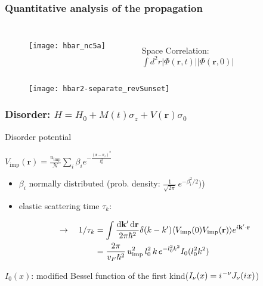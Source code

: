 \documentclass{beamer}
\newcommand{\vq}{\mathbf{r}}
\newcommand{\iu}{{i\mkern1mu}} 	%
\newcommand{\vk}{\mathbf{k}}
\begin{document}
  
\begin{frame}[t]%
  \frametitle{Quantitative analysis of the propagation}
  \vskip-0.7cm
  \begin{columns}
  
  \begin{figure}\centering
      \texttt{[image: hbar\_nc5a]}
  \end{figure}
  
  \hskip-1cm
  \\  Space Correlation:\\
  $\int d^2r |\Phi(\mathbf{r}, t)| |\Phi(\mathbf{r}, 0)|$\\
  
  
  \end{columns}
  \vskip-0.2cm
  
  \begin{figure}\centering
   \texttt{[image: hbar2-separate\_revSunset]}
  \end{figure}
  
  \end{frame}

\begin{frame}%
  \frametitle{Disorder: $H = H_0 + M(t) \sigma_z + V(\vq) \sigma_0$ }
  \begin{block}{Disorder potential}
  \begin{center} $V_{\mathrm{imp}}(\vq) = \frac{u_{\mathrm{imp}}}{\mathcal{N}} \sum\limits_i \beta_i e^{-\frac{(\vq-\vq_i)^2}{l_0^2}}$\end{center}
  \begin{itemize}
   \item $\beta_i$ normally distributed (prob. density: $\frac{1}{\sqrt{2\pi}} \, e^{-\beta_i^2/2})$)
   \item elastic scattering time $\tau_k$:
  \end{itemize}
  \vskip-0.4cm
    \begin{align*}\rightarrow \quad 1/\tau_k &=  \int \frac{{\rm d}\vk^\prime \,{\rm d}\vq}{2\pi\hbar^2} \delta(k-k^\prime) \langle V_\mathrm{imp}(0)V_\mathrm{imp}(\vq)\rangle e^{i \vk^\prime\cdot\vq } \\ &= \frac{2\pi}{v_F\hbar^2} \,u_{\mathrm{imp}}^2 \,l_0^2 \,k\, e^{-l_0^2k^2} I_0(l_0^2k^2) \end{align*}
  \end{block}
  $I_0(x)$: modified Bessel function of the first kind\hfill {\footnotesize ($I_\nu(x) = \iu^{-\nu} J_\nu(\iu x)$)}
  \end{frame}
  
\end{document}
